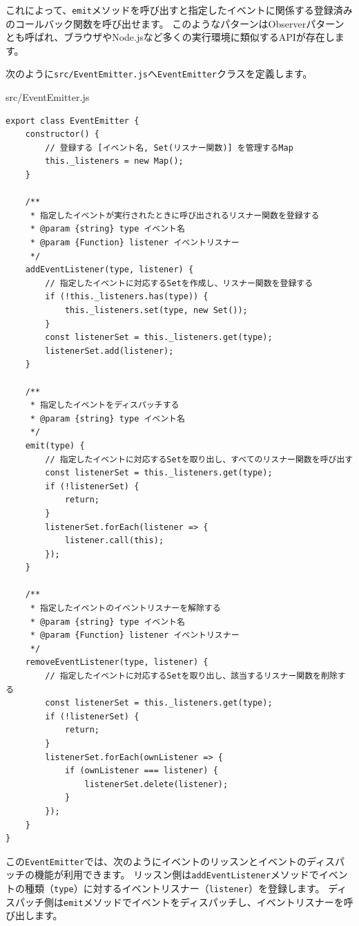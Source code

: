 これによって、\texttt{emit}メソッドを呼び出すと指定したイベントに関係する登録済みのコールバック関数を呼び出せます。
このようなパターンはObserverパターンとも呼ばれ、ブラウザやNode.jsなど多くの実行環境に類似するAPIが存在します。

次のように\texttt{src/EventEmitter.js}へ\texttt{EventEmitter}クラスを定義します。

\begin{listtitle}
src/EventEmitter.js
\end{listtitle}
\begin{lstlisting}
export class EventEmitter {
    constructor() {
        // 登録する [イベント名, Set(リスナー関数)] を管理するMap
        this._listeners = new Map();
    }

    /**
     * 指定したイベントが実行されたときに呼び出されるリスナー関数を登録する
     * @param {string} type イベント名
     * @param {Function} listener イベントリスナー
     */
    addEventListener(type, listener) {
        // 指定したイベントに対応するSetを作成し、リスナー関数を登録する
        if (!this._listeners.has(type)) {
            this._listeners.set(type, new Set());
        }
        const listenerSet = this._listeners.get(type);
        listenerSet.add(listener);
    }

    /**
     * 指定したイベントをディスパッチする
     * @param {string} type イベント名
     */
    emit(type) {
        // 指定したイベントに対応するSetを取り出し、すべてのリスナー関数を呼び出す
        const listenerSet = this._listeners.get(type);
        if (!listenerSet) {
            return;
        }
        listenerSet.forEach(listener => {
            listener.call(this);
        });
    }

    /**
     * 指定したイベントのイベントリスナーを解除する
     * @param {string} type イベント名
     * @param {Function} listener イベントリスナー
     */
    removeEventListener(type, listener) {
        // 指定したイベントに対応するSetを取り出し、該当するリスナー関数を削除する
        const listenerSet = this._listeners.get(type);
        if (!listenerSet) {
            return;
        }
        listenerSet.forEach(ownListener => {
            if (ownListener === listener) {
                listenerSet.delete(listener);
            }
        });
    }
}
\end{lstlisting}
\listend

この\texttt{EventEmitter}では、次のようにイベントのリッスンとイベントのディスパッチの機能が利用できます。
リッスン側は\texttt{addEventListener}メソッドでイベントの種類（\texttt{type}）に対するイベントリスナー（\texttt{listener}）を登録します。
ディスパッチ側は\texttt{emit}メソッドでイベントをディスパッチし、イベントリスナーを呼び出します。

